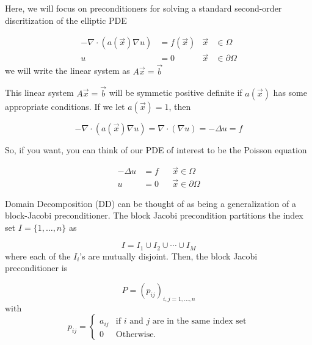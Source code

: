 Here, we will focus on preconditioners for solving a standard second-order discritization of the elliptic PDE

\begin{align*}
    - \nabla \cdot (a(\vec{x})\nabla u) &= f(\vec{x})  & \vec{x} &\in \Omega\\
    u&=0 & \vec{x} &\in \partial \Omega
\end{align*}
we will write the linear system as $A\vec{x}=\vec{b}$


This linear system $A\vec{x}=\vec{b}$ will be symmetic positive definite if $a(\vec{x})$ has some appropriate conditions. If we let $a(\vec{x})=1$, then

\begin{equation*}
    -\nabla \cdot ( a(\vec{x}) \nabla u )= \nabla \cdot (\nabla u) = -\Delta u = f
\end{equation*}

So, if you want, you can think of our PDE of interest to be the Poisson equation

\begin{align*}
    -\Delta u &=f &&\vec{x} \in \Omega \\
    u &= 0 &&\vec{x}\in \partial \Omega
\end{align*}

Domain Decomposition (DD) can be thought of as being a generalization of a block-Jacobi preconditioner. The block Jacobi precondition partitions the index set $I=\{1, \ldots, n\}$ as

\begin{equation*}
    I = I_1 \cup I_2 \cup \cdots \cup I_M
\end{equation*}
where each of the $I_i$'s are mutually disjoint. Then, the block Jacobi preconditioner is

\begin{equation*}
    P = (p_{ij})_{i, j=1, \ldots, n}
\end{equation*}
with
\begin{equation*}
    p_{ij} = \begin{cases}
    a_{ij} & \text{if $i$ and $j$ are in the same index set}\\
    0 & \text{Otherwise.}
\end{cases}
\end{equation*}

